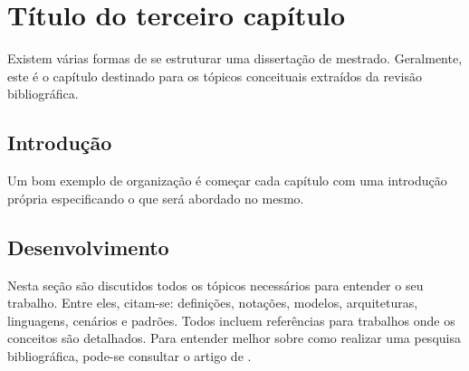 \chapter{Título do terceiro capítulo} \label{cap:cap3}

Existem várias formas de se estruturar uma dissertação de mestrado. 
Geralmente, este é o capítulo destinado para os tópicos conceituais extraídos da revisão bibliográfica. 

\section{Introdução}\label{sec:intro}

Um bom exemplo de organização é começar cada capítulo com uma introdução própria especificando o que será abordado no mesmo.

\section{Desenvolvimento}\label{sec:desenv}

Nesta seção são discutidos todos os tópicos necessários para entender o seu trabalho. Entre eles, citam-se: definições, notações, modelos, arquiteturas, linguagens, cenários e padrões. Todos incluem referências para trabalhos onde os conceitos são detalhados.
Para entender melhor sobre como realizar uma pesquisa bibliográfica, pode-se consultar o artigo de \cite{traina2009fazer}.